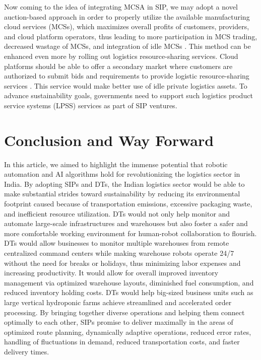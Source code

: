 \documentclass[paper=a4wide, fontsize=12pt]{scrartcl}
\begin{document}
Now coming to the idea of integrating MCSA in SIP, we may adopt a novel auction-based approach in order to properly utilize the available manufacturing cloud services (MCSs), which maximizes overall profits of customers, providers, and cloud platform operators, thus leading to more participation in MCS trading, decreased wastage of MCSs, and integration of idle MCSs \cite{Kang2022}. This method can be enhanced even more by rolling out logistics resource-sharing services. Cloud platforms should be able to offer a secondary market where customers are authorized to submit bids and requirements to provide logistic resource-sharing services \cite{KANG2021123881}. This service would make better use of idle private logistics assets. To advance sustainability goals, governments need to support such logistics product service systems (LPSS) services as part of SIP ventures.

\section{Conclusion and Way Forward}

In this article, we aimed to highlight the immense potential that robotic automation and AI algorithms hold for revolutionizing the logistics sector in India. By adopting SIPs and DTs, the Indian logistics sector would be able to make substantial strides toward sustainability by reducing its environmental footprint caused because of transportation emissions, excessive packaging waste, and inefficient resource utilization. DTs would not only help monitor and automate large-scale infrastructures and warehouses but also foster a safer and more comfortable working environment for human-robot collaboration to flourish. DTs would allow businesses to monitor multiple warehouses from remote centralized command centers while making warehouse robots operate 24/7 without the need for breaks or holidays, thus minimizing labor expenses and increasing productivity. It would allow for overall improved inventory management via optimized warehouse layouts, diminished fuel consumption, and reduced inventory holding costs. DTs would help big-sized business units such as large vertical hydroponic farms achieve streamlined and accelerated order processing. By bringing together diverse operations and helping them connect optimally to each other, SIPs promise to deliver maximally in the areas of optimized route planning, dynamically adaptive operations, reduced error rates, handling of fluctuations in demand, reduced transportation costs, and faster delivery times. \\
\end{document}
